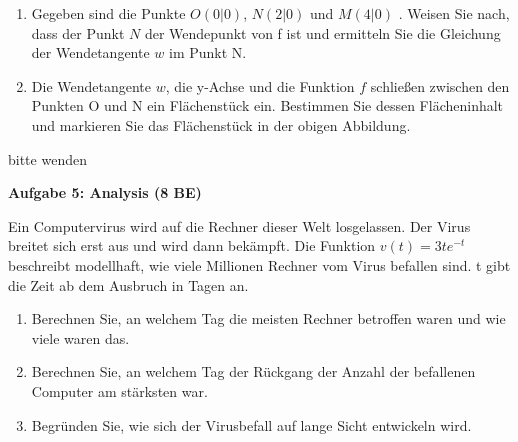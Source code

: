 \documentclass[a4paper,12pt]{article}
\newcommand{\Aufgabe}[1]{
  {
  \vspace*{0.5cm}
  \textsf{\textbf{Aufgabe #1}}
  \vspace*{0.2cm}
  
  }
}
\begin{document}
\begin{enumerate}[label={\alph*)}]
\item Gegeben sind die Punkte $O(0|0)$, $N(2|0)$  und $M(4|0)$ . Weisen Sie nach, dass der Punkt $N$ der Wendepunkt von f ist und ermitteln Sie die Gleichung der Wendetangente $ w$ im Punkt N. 
\item Die Wendetangente $ w$, die y-Achse und die Funktion $f$ schließen zwischen den Punkten O und N ein Flächenstück ein. Bestimmen Sie dessen Flächeninhalt und markieren Sie das Flächenstück in der obigen Abbildung.

\end{enumerate}

\vspace{1.5cm} 
\begin{flushright}bitte wenden \end{flushright}

\newpage
\Aufgabe{5: Analysis (8 BE)}

Ein Computervirus wird auf die Rechner dieser Welt losgelassen. Der Virus breitet sich erst
aus und wird dann bekämpft. Die Funktion $v (t )=3 t e^{-t}$
beschreibt modellhaft, wie viele
Millionen Rechner vom Virus befallen sind. t gibt die Zeit ab dem Ausbruch in Tagen an.
\begin{enumerate}[label={\alph*)}]
\item Berechnen Sie, an welchem Tag die meisten Rechner betroffen waren und wie viele waren das.
\item Berechnen Sie, an welchem Tag der Rückgang der Anzahl der befallenen Computer am stärksten war.
\item  Begründen Sie, wie sich der Virusbefall auf lange Sicht entwickeln wird.
\end{enumerate}

\end{document}
